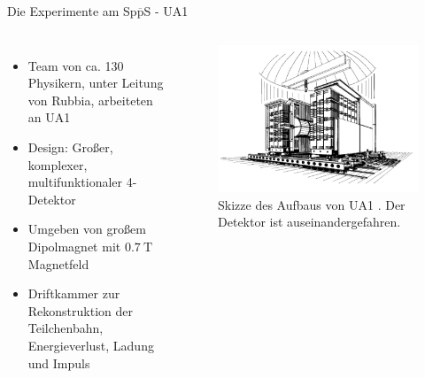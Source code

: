 \documentclass[aspectratio=1610, professionalfonts, 10pt]{beamer}
\begin{document}
\begin{frame}{Die Experimente am Sp$\overline{\text{p}}$S - UA1}
	\begin{columns}
				\begin{itemize}
					\setlength\itemsep{0.5em}
					\item Team von ca. 130 Physikern, unter Leitung von Rubbia, arbeiteten an UA1
					\item Design: Gro{\ss}er, komplexer, multifunktionaler 4\pi-Detektor
					\item Umgeben von gro{\ss}em Dipolmagnet mit $\SI{0.7}{\tesla}$ Magnetfeld
					\item Driftkammer zur Rekonstruktion der Teilchenbahn, Energieverlust, Ladung und Impuls
				\end{itemize}
			\begin{figure}
	  			\centering
				\includegraphics[width=\linewidth]{Images/Screenshot_2018-12-04_16-44-02.png}
				\caption{Skizze des Aufbaus von UA1 \cite{doi:10.1142/9789814644150_0006}. Der Detektor ist auseinandergefahren. }
	  			\label{fig:sad}
			\end{figure}
	\end{columns}
\end{frame}
\end{document}
